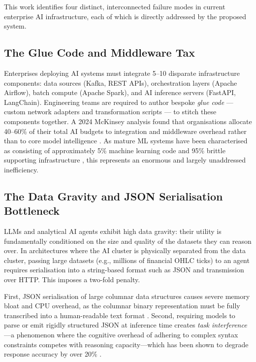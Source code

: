 \documentclass[12pt, a4paper]{report}
\begin{document}
This work identifies four distinct, interconnected failure modes in current enterprise AI
infrastructure, each of which is directly addressed by the proposed system.

\subsection{The Glue Code and Middleware Tax}
\label{ssec:gluecode}

Enterprises deploying AI systems must integrate 5--10 disparate infrastructure components:
data sources (Kafka, REST APIs), orchestration layers (Apache Airflow), batch compute
(Apache Spark), and AI inference servers (FastAPI, LangChain). Engineering teams are
required to author bespoke \emph{glue code} — custom network adapters and transformation
scripts — to stitch these components together.
A 2024 McKinsey analysis found that organisations allocate 40--60\% of their total AI
budgets to integration and middleware overhead rather than to core model intelligence
\citep{mckinsey2024}. As mature ML systems have been characterised as consisting of
approximately 5\% machine learning code and 95\% brittle supporting infrastructure
\citep{sculley2015hidden}, this represents an enormous and largely unaddressed
inefficiency.

\subsection{The Data Gravity and JSON Serialisation Bottleneck}
\label{ssec:datagravity}

LLMs and analytical AI agents exhibit high data gravity: their utility is fundamentally conditioned on the size and quality of the datasets they can reason over. In architectures where the AI cluster is physically separated from the data cluster, passing large datasets (e.g., millions of financial OHLC ticks) to an agent requires serialisation into a string-based format such as JSON and transmission over HTTP. This imposes a two-fold penalty. 

First, JSON serialisation of large columnar data structures causes severe memory bloat and CPU overhead, as the columnar binary representation must be fully transcribed into a human-readable text format \citep{arrow2024}. Second, requiring models to parse or emit rigidly structured JSON at inference time creates \emph{task interference}---a phenomenon where the cognitive overhead of adhering to complex syntax constraints competes with reasoning capacity---which has been shown to degrade response accuracy by over 20\% \citep{Tam2024, Gupta2025}.
\end{document}

